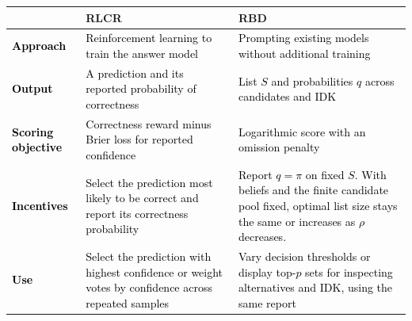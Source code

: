 \begin{tabular}{@{}p{42pt}p{\dimexpr(\columnwidth-54pt)/2\relax}p{\dimexpr(\columnwidth-54pt)/2\relax}@{}}
\toprule
& \textbf{RLCR} & \textbf{RBD}\\
\midrule
\raggedright\textcolor{black}{\textbf{Approach}}\par & \raggedright\textcolor{black}{Reinforcement learning to train the answer model}\par & \raggedright\textcolor{black}{Prompting existing models without additional training}\par\tabularnewline
\addlinespace[5pt]
\raggedright\textcolor{black}{\textbf{Output}}\par & \raggedright\textcolor{black}{A prediction and its reported probability of correctness}\par & \raggedright\textcolor{black}{List $S$ and probabilities $q$ across candidates and IDK}\par\tabularnewline
\addlinespace[5pt]
\raggedright\textcolor{black}{\textbf{Scoring objective}}\par & \raggedright\textcolor{black}{Correctness reward minus Brier loss for reported confidence}\par & \raggedright\textcolor{black}{Logarithmic score with an omission penalty}\par\tabularnewline
\addlinespace[5pt]
\raggedright\textcolor{black}{\textbf{Incentives}}\par & \raggedright\textcolor{black}{Select the prediction most likely to be correct and report its correctness probability}\par & \raggedright\textcolor{black}{Report $q=\pi$ on fixed $S$. With beliefs and the finite candidate pool fixed, optimal list size stays the same or increases as $\rho$ decreases.}\par\tabularnewline
\addlinespace[5pt]
\raggedright\textcolor{black}{\textbf{Use}}\par & \raggedright\textcolor{black}{Select the prediction with highest confidence or weight votes by confidence across repeated samples}\par & \raggedright\textcolor{black}{Vary decision thresholds or display top-$p$ sets for inspecting alternatives and IDK, using the same report}\par\tabularnewline
\bottomrule
\end{tabular}

